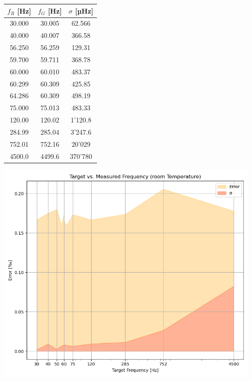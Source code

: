 \noindent\begin{minipage}[t]{.44\linewidth}\vspace{0pt}
\vspace{-1em}
\begin{centering}
\tablevspaceAStable
\begin{tabular}{ @{} >{\RaggedRight\hspace{0pt}} ccc @{} }
    $f_R$ [Hz] & $f_G$ [Hz] & $\sigma$ [µHz] \\
    \hline
    30.000 & 30.005 & 62.566 \\ 
    40.000 & 40.007 & 366.58 \\ 
    56.250 & 56.259 & 129.31 \\ 
    59.700 & 59.711 & 368.78 \\ 
    60.000 & 60.010 & 483.37 \\ 
    60.299 & 60.309 & 425.85 \\ 
    64.286 & 60.309 & 498.19 \\ 
    75.000 & 75.013 & 483.33 \\ 
    120.00 & 120.02 & 1'120.8 \\ 
    284.99 & 285.04 & 3'247.6 \\ 
    752.01 & 752.16 & 20'029 \\
    4500.0 & 4499.6 & 370'780
\end{tabular}
\label{table:Eingestellte-Gemessene-Frequenzen}
\end{centering}
\end{minipage}
\noindent\begin{minipage}[t]{.55\linewidth}\vspace{0pt}
\includegraphics[width=\linewidth]{../images/results-calibrated-frequencies.png}
\vspace{-2.5em}
\label{img:Eingestellte-Gemessene-Frequenzen}
\end{minipage}

